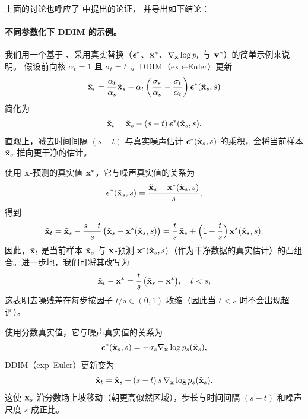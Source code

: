 上面的讨论也呼应了  中提出的论证，
并导出如下结论：





\paragraph{不同参数化下 DDIM 的示例。}
我们用一个基于 、采用真实替换（${\bm{\epsilon}}^*$、${\mathbf{x}}^*$、$\nabla_{\mathbf{x}}\log p_t$ 与 ${\mathbf{v}}^*$）的简单示例来说明。
假设前向核 $\alpha_t=1$ 且 $\sigma_t=t$~\citep{karras2022elucidating}。DDIM（exp--Euler）更新
\[
\tilde{{\mathbf{x}}}_{t} = \frac{\alpha_{t}}{\alpha_{s}}\tilde{{\mathbf{x}}}_{s}
- \alpha_{t} \left(\frac{\sigma_{s}}{\alpha_{s}} - \frac{\sigma_{t}}{\alpha_{t}}\right)
{\bm{\epsilon}}^*(\tilde{{\mathbf{x}}}_{s}, s)
\]
简化为
\[
\tilde{{\mathbf{x}}}_t = \tilde{{\mathbf{x}}}_s - (s-t)\,{\bm{\epsilon}}^*(\tilde{{\mathbf{x}}}_s,s).
\]
直观上，减去时间间隔 $(s-t)$ 与真实噪声估计
${\bm{\epsilon}}^*(\tilde{{\mathbf{x}}}_s,s)$ 的乘积，会将当前样本 $\tilde{{\mathbf{x}}}_s$ 推向更干净的估计。

使用 ${\mathbf{x}}$-预测的真实值 ${\mathbf{x}}^*$，它与噪声真实值的关系为
\[
{\bm{\epsilon}}^*(\tilde{{\mathbf{x}}}_s,s) = \frac{\tilde{{\mathbf{x}}}_s - {\mathbf{x}}^*(\tilde{{\mathbf{x}}}_s, s)}{s},
\]
得到
\begin{align}\label{eq:ctm-formulation}
    \tilde{{\mathbf{x}}}_t
 = \tilde{{\mathbf{x}}}_s - \frac{s-t}{s}\,\bigl(\tilde{{\mathbf{x}}}_s - {\mathbf{x}}^*(\tilde{{\mathbf{x}}}_s, s)\bigr)
 = \frac{t}{s}\,\tilde{{\mathbf{x}}}_s + \Bigl(1-\frac{t}{s}\Bigr)\,{\mathbf{x}}^*(\tilde{{\mathbf{x}}}_s, s).
\end{align}
因此，$\tilde{{\mathbf{x}}}_t$ 是当前样本 $\tilde{{\mathbf{x}}}_s$ 与 ${\mathbf{x}}$-预测 ${\mathbf{x}}^*(\tilde{{\mathbf{x}}}_s, s)$（作为干净数据的真实估计）的凸组合。进一步地，我们可将其改写为
\[
\tilde{{\mathbf{x}}}_t-{\mathbf{x}}^* = \frac{t}{s}\,\bigl(\tilde{{\mathbf{x}}}_s-{\mathbf{x}}^*\bigr),\quad t<s,
\]
这表明去噪残差在每步按因子 $t/s\in(0,1)$ 收缩（因此当 $t<s$ 时不会出现超调）。

使用分数真实值，它与噪声真实值的关系为
\[
{\bm{\epsilon}}^*(\tilde{{\mathbf{x}}}_s, s) = -\sigma_s \nabla_{{\mathbf{x}}}\log p_s(\tilde{{\mathbf{x}}}_s),
\]
DDIM（exp--Euler）更新变为
\[
\tilde{{\mathbf{x}}}_t = \tilde{{\mathbf{x}}}_s + (s-t)\,s\,\nabla_{{\mathbf{x}}}\log p_s(\tilde{{\mathbf{x}}}_s).
\]
这使 $\tilde{{\mathbf{x}}}_s$ 沿分数场上坡移动（朝更高似然区域），步长与时间间隔 $(s-t)$ 和噪声尺度 $s$ 成正比。

